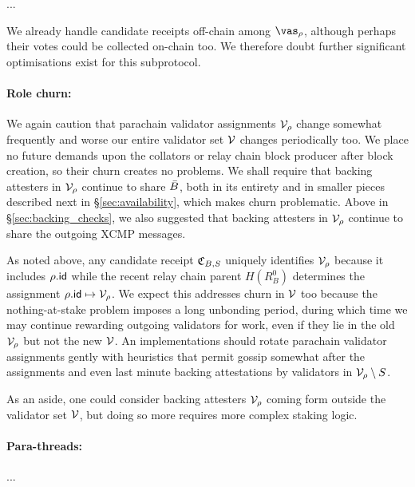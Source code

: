 ...

We already handle candidate receipts off-chain among $\vas_\para$, although perhaps their votes could be collected on-chain too.  We therefore doubt further significant optimisations exist for this subprotocol.

\smallskip
\paragraph{Role churn:}

We again caution that parachain validator assignments $\mathcal{V}_{\rho}$ change somewhat frequently and worse our entire validator set $\mathcal{V}$ changes periodically too.  We place no future demands upon the collators or relay chain block producer after block creation, so their churn creates no problems.  We shall require that backing attesters in $\mathcal{V}_{\rho}$ continue to share $\bar{B}$, both in its entirety and in smaller pieces described next in \S\ref{sec:availability}, which makes churn problematic.  Above in \S\ref{sec:backing_checks}, we also suggested that backing attesters in $\mathcal{V}_{\rho}$ continue to share the outgoing XCMP messages.

As noted above, any candidate receipt $\mathfrak{C}_{B,S}$ uniquely identifies $\mathcal{V}_{\rho}$ because it includes $\rho.\mathsf{id}$ while the recent relay chain parent $H(R^0_B)$ determines the assignment $\rho.\mathsf{id} \mapsto \mathcal{V}_{\rho}$.
We expect this addresses churn in $\mathcal{V}$ too because the nothing-at-stake problem imposes a long unbonding period, during which time we may continue rewarding outgoing validators for work, even if they lie in the old $\mathcal{V}_{\rho}$ but not the new $\mathcal{V}$.   
An implementations should rotate parachain validator assignments gently with heuristics that permit gossip somewhat after the assignments and even last minute backing attestations by validators in $\mathcal{V}_{\rho} \setminus S$.

As an aside, one could consider backing attesters $\mathcal{V}_{\rho}$ coming form outside the validator set $\mathcal{V}$, but doing so more requires more complex staking logic. 

\smallskip
\paragraph{Para-threads:}

...
